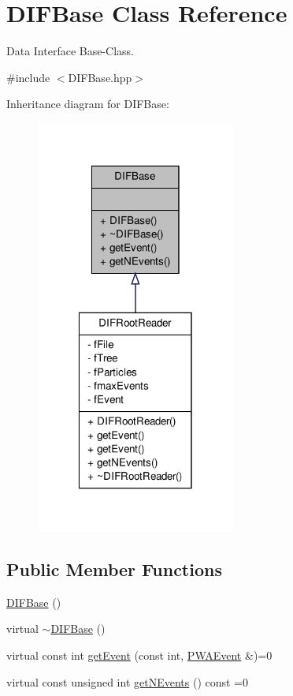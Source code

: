 \hypertarget{classDIFBase}{
\section{DIFBase Class Reference}
\label{d9/db5/classDIFBase}
}


Data Interface Base-\/Class.  




{\ttfamily \#include $<$DIFBase.hpp$>$}



Inheritance diagram for DIFBase:
\nopagebreak
\begin{figure}[H]
\begin{center}
\leavevmode
\includegraphics[width=186pt]{da/d1e/classDIFBase__inherit__graph}
\end{center}
\end{figure}
\subsection*{Public Member Functions}
\begin{DoxyCompactItemize}
\item 
\hyperlink{classDIFBase_acbbc1c92aa68251a8bc21a49d3c23374}{DIFBase} ()
\item 
virtual \hyperlink{classDIFBase_a36a102f92fd77b49a88274b88d150905}{$\sim$DIFBase} ()
\item 
virtual const int \hyperlink{classDIFBase_ab31cfae817f0420fa6a7b8b2cc013baa}{getEvent} (const int, \hyperlink{classPWAEvent}{PWAEvent} \&)=0
\item 
virtual const unsigned int \hyperlink{classDIFBase_a69e359ba0221a1b7bb32cdcbb819d56a}{getNEvents} () const =0
\end{DoxyCompactItemize}


